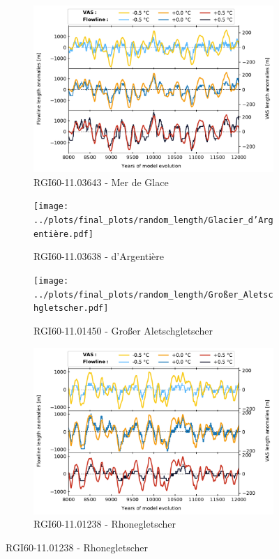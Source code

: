 \begin{figure}[htp]
\begin{subfigure}[b]{0.48\textwidth}
          \caption{RGI60-11.03643 - Mer de Glace}
          \label{fig:random_length:mer_de_glace}
          \centering
          \includegraphics[width=\textwidth]{../plots/final_plots/random_length/Mer_de_Glace.pdf}
        \end{subfigure}
        \hfill
        \begin{subfigure}[b]{0.48\textwidth}
          \caption{RGI60-11.03638 - d'Argentière}
          \label{fig:random_length:glacier_d_argentiere}
          \centering
          \texttt{[image: ../plots/final\_plots/random\_length/Glacier\_d'Argentière.pdf]}
        \end{subfigure}
        \begin{subfigure}[b]{0.48\textwidth}
          \caption{RGI60-11.01450 - Großer Aletschgletscher}
          \label{fig:random_length:großer_aletschgletscher}
          \centering
          \texttt{[image: ../plots/final\_plots/random\_length/Großer\_Aletschgletscher.pdf]}
        \end{subfigure}
        \hfill
        \begin{subfigure}[b]{0.48\textwidth}
          \caption{RGI60-11.01238 - Rhonegletscher}
          \label{fig:random_length:rhonegletscher}
          \centering
          \includegraphics[width=\textwidth]{../plots/final_plots/random_length/Rhonegletscher.pdf}
        \end{subfigure}


\end{figure}
